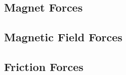 \subsection{Magnet Forces}
\label{sec:force_magnet}


\subsection{Magnetic Field Forces}
\label{sec:force_field}



\subsection{Friction Forces}
\label{sec:force_friction}



